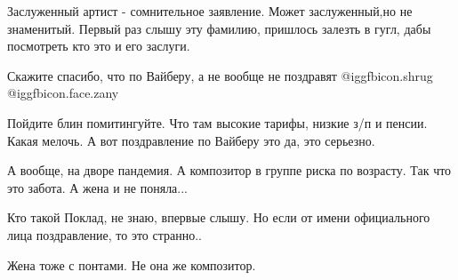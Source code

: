 \begin{multicols}{2}

Заслуженный артист -  сомнительное заявление. Может заслуженный,но не
знаменитый. Первый раз слышу эту фамилию, пришлось залезть в гугл, дабы
посмотреть кто это и его заслуги. 

Скажите спасибо, что по Вайберу, а не вообще не поздравят @igg{fbicon.shrug}
@igg{fbicon.face.zany} 

Пойдите блин помитингуйте. Что там высокие тарифы, низкие з/п и пенсии. Какая
мелочь. А вот поздравление по Вайберу это да, это серьезно.

А вообще, на дворе пандемия. А композитор в группе риска по возрасту. Так что
это забота. А жена и не поняла...


Кто такой Поклад, не знаю, впервые слышу. Но если от имени официального лица
поздравление, то это странно..


Жена тоже с понтами. Не она же композитор.


\end{multicols}
